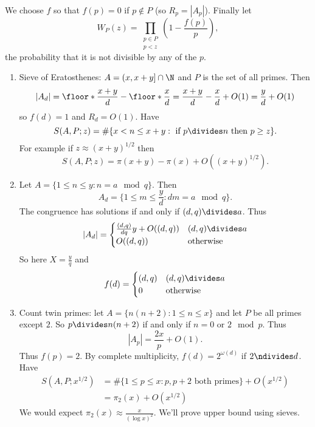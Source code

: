 \documentclass[a4paper]{article}
\begin{document}
We choose \(f\) so that \(f(p) = 0\) if \(p \notin P\) (so \(R_p = |A_p|\)). Finally let
\[
  W_P(z) = \prod_{\substack{p \in P \\ p < z}} \left( 1 - \frac{f(p)}{p} \right),
\]
the probability that it is not divisible by any of the \(p\).

\begin{eg}\leavevmode
  \begin{enumerate}
  \item Sieve of Eratosthenes: \(A = (x, x + y] \cap \N\) and \(P\) is the set of all primes. Then
    \[
      |A_d|
      = \floor*{\frac{x + y}{d}} - \floor*{\frac{x}{d}}
      = \frac{x + y}{d} - \frac{x}{d} + O(1)
      = \frac{y}{d} + O(1)
    \]
    so \(f(d) = 1\) and \(R_d = O(1)\). Have
    \[
      S(A, P; z) = \#\{x < n \leq x + y: \text{ if } p \divides n \text{ then } p \geq z\}.
    \]
    For example if \(z \approx (x + y)^{1/2}\) then
    \[
      S(A, P; z) = \pi(x + y) - \pi(x) + O((x + y)^{1/2}).
    \]
  \item Let \(A = \{1 \leq n \leq y: n = a \mod q\}\). Then
    \[
      A_d = \{1 \leq m \leq \frac{y}{d}: dm = a \mod q\}.
    \]
    The congruence has solutions if and only if \((d, q) \divides a\). Thus
    \[
      |A_d| =
      \begin{cases}
        \frac{(d, q)}{dq} y + O((d, q)) & (d, q) \divides a \\
        O((d, q)) & \text{otherwise}
      \end{cases}
    \]
    So here \(X = \frac{y}{q}\) and
    \[
      f(d) =
      \begin{cases}
        (d, q) & (d, q) \divides a \\
        0 & \text{otherwise}
      \end{cases}
    \]
  \item Count twin primes: let \(A = \{n (n + 2): 1 \leq n \leq x\}\) and let \(P\) be all primes except \(2\). So \(p \divides n(n + 2)\) if and only if \(n = 0 \text{ or } 2 \mod p\). Thus
    \[
      |A_p| = \frac{2x}{p} + O(1).
    \]
    Thus \(f(p) = 2\). By complete multiplicity, \(f(d) = 2^{\omega(d)}\) if \(2 \ndivides d\). Have
    \begin{align*}
      S(A, P; x^{1/2})
      &= \#\{1 \leq p \leq x: p, p + 2 \text{ both primes}\} + O(x^{1/2}) \\
      &= \pi_2(x) + O(x^{1/2})
    \end{align*}
    We would expect \(\pi_2(x) \approx \frac{x}{(\log x)^2}\). We'll prove upper bound using sieves.
  \end{enumerate}
\end{eg}
\end{document}

